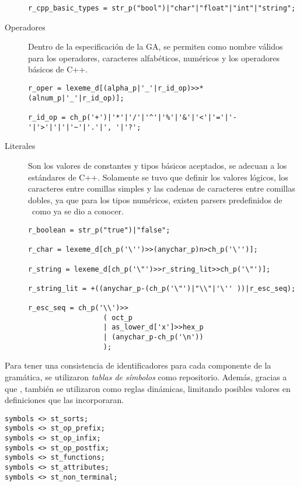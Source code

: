 \begin{description}
\begin{lstlisting}[float=!ht, columns=fullflexible, linewidth=12.6cm]
r_cpp_basic_types = str_p("bool")|"char"|"float"|"int"|"string";
\end{lstlisting}

\item [Operadores] Dentro de la especificación de la GA, se permiten como nombre válidos para los operadores, caracteres alfabéticos, numéricos y los operadores básicos de C++. 

\begin{lstlisting}[columns=fullflexible, linewidth=11.5cm]
r_oper = lexeme_d[(alpha_p|'_'|r_id_op)>>*(alnum_p|'_'|r_id_op)];

r_id_op = ch_p('+')|'*'|'/'|'^'|'%'|'&'|'<'|'='|'-'|'>'|'|'|'~'|'.'|', '|'?';
\end{lstlisting}

\item [Literales] Son los valores de constantes y tipos básicos aceptados, se adecuan a los estándares de C++. Solamente se tuvo que definir los valores lógicos, los caracteres entre comillas simples y las cadenas de caracteres entre comillas dobles, ya que para los tipos numéricos, existen parsers predefinidos de \spirit\ como ya se dio a conocer.

\begin{lstlisting}[columns=fullflexible, linewidth=10.7cm]
r_boolean = str_p("true")|"false";

r_char = lexeme_d[ch_p('\'')>>(anychar_p)n>ch_p('\'')];

r_string = lexeme_d[ch_p('\"')>>r_string_lit>>ch_p('\"')];

r_string_lit = +((anychar_p-(ch_p('\"')|"\\"|'\'' ))|r_esc_seq);

r_esc_seq = ch_p('\\')>>
                  ( oct_p
                  | as_lower_d['x']>>hex_p
                  | (anychar_p-ch_p('\n'))
                  );
\end{lstlisting}
\end{description}

Para tener una consistencia de identificadores para cada componente de la gramática, se utilizaron \textit{tablas de símbolos} como repositorio. Además, gracias a que \spirit, también se utilizaron como reglas dinámicas, limitando posibles valores en definiciones que las incorporaran.

\begin{lstlisting}[columns=fullflexible, linewidth=5.5cm]
symbols <> st_sorts;
symbols <> st_op_prefix;
symbols <> st_op_infix;
symbols <> st_op_postfix;
symbols <> st_functions;
symbols <> st_attributes;
symbols <> st_non_terminal;
\end{lstlisting}

